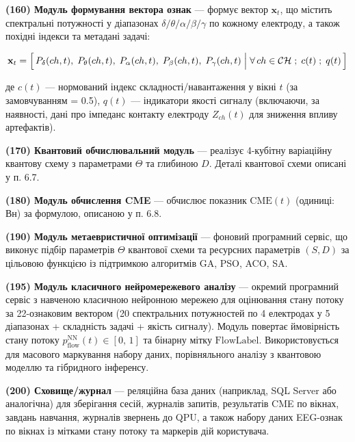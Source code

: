 \documentclass[12pt,a4paper]{article}
\begin{document}
\textbf{(160) Модуль формування вектора ознак} --- формує вектор \(\mathbf{x}_t\), що містить спектральні потужності у діапазонах \(\delta/\theta/\alpha/\beta/\gamma\) по кожному електроду, а також похідні індекси та метадані задачі:



\[\mathbf{x}_t = \Bigl[\,P_\delta(ch,t),\;P_\theta(ch,t),\;P_\alpha(ch,t),\;P_\beta(ch,t),\;P_\gamma(ch,t)\;\Big|\;\forall\,ch \in \mathcal{CH}\;;\;c(t)\;;\;q(t)\,\Bigr]\]



де \(c(t)\) --- нормований індекс складності/навантаження у вікні \(t\) (за замовчуванням = 0.5), \(q(t)\) --- індикатори якості сигналу (включаючи, за наявності, дані про імпеданс контакту електроду \(Z_{ch}(t)\) для зниження впливу артефактів).



\textbf{(170) Квантовий обчислювальний модуль} --- реалізує 4-кубітну варіаційну квантову схему з параметрами \(\Theta\) та глибиною \(D\). Деталі квантової схеми описані у п. 6.7.



\textbf{(180) Модуль обчислення CME} --- обчислює показник \(\text{CME}(t)\) (одиниці: Вн) за формулою, описаною у п. 6.8.



\textbf{(190) Модуль метаевристичної оптимізації} --- фоновий програмний сервіс, що виконує підбір параметрів \(\Theta\) квантової схеми та ресурсних параметрів \((S, D)\) за цільовою функцією із підтримкою алгоритмів GA, PSO, ACO, SA.



\textbf{(195) Модуль класичного нейромережевого аналізу} --- окремий програмний сервіс з навченою класичною нейронною мережею для оцінювання стану потоку за 22-ознаковим вектором (20 спектральних потужностей по 4 електродах у 5 діапазонах + складність задачі + якість сигналу). Модуль повертає ймовірність стану потоку \(p_{\text{flow}}^{\text{NN}}(t) \in [0,\,1]\) та бінарну мітку \(\text{FlowLabel}\). Використовується для масового маркування набору даних, порівняльного аналізу з квантовою моделлю та гібридного інференсу.



\textbf{(200) Сховище/журнал} --- реляційна база даних (наприклад, SQL Server або аналогічна) для зберігання сесій, журналів запитів, результатів CME по вікнах, завдань навчання, журналів звернень до QPU, а також набору даних EEG-ознак по вікнах із мітками стану потоку та маркерів дій користувача.
\end{document}
